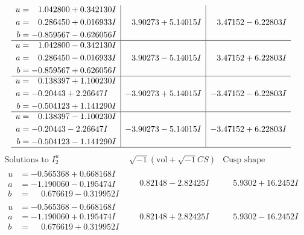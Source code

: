 \documentclass[1p]{elsarticle_modified}
\theoremstyle{definition}
\newcommand{\I}{\sqrt{-1}}
\begin{document}
$$\begin{array}{c|c|c}
\begin{aligned}
u &= \phantom{-}1.042800 + 0.342130 I \\
a &= \phantom{-}0.286450 + 0.016933 I \\
b &= -0.859567 - 0.626056 I\end{aligned}
 & \phantom{-}3.90273 + 5.14015 I & \phantom{-}3.47152 - 6.22803 I \\ \hline\begin{aligned}
u &= \phantom{-}1.042800 - 0.342130 I \\
a &= \phantom{-}0.286450 - 0.016933 I \\
b &= -0.859567 + 0.626056 I\end{aligned}
 & \phantom{-}3.90273 - 5.14015 I & \phantom{-}3.47152 + 6.22803 I \\ \hline\begin{aligned}
u &= \phantom{-}0.138397 + 1.100230 I \\
a &= -0.20443 + 2.26647 I \\
b &= -0.504123 + 1.141290 I\end{aligned}
 & -3.90273 + 5.14015 I & -3.47152 - 6.22803 I \\ \hline\begin{aligned}
u &= \phantom{-}0.138397 - 1.100230 I \\
a &= -0.20443 - 2.26647 I \\
b &= -0.504123 - 1.141290 I\end{aligned}
 & -3.90273 - 5.14015 I & -3.47152 + 6.22803 I\\
 \hline 
 \end{array}$$\newpage$$\begin{array}{c|c|c}  
\text{Solutions to }I^u_{2}& \I (\text{vol} + \sqrt{-1}CS) & \text{Cusp shape}\\
 \hline 
\begin{aligned}
u &= -0.565368 + 0.668168 I \\
a &= -1.190060 - 0.195474 I \\
b &= \phantom{-}0.676619 - 0.319952 I\end{aligned}
 & \phantom{-}0.82148 - 2.82425 I & \phantom{-}5.9302 + 16.2452 I \\ \hline\begin{aligned}
u &= -0.565368 - 0.668168 I \\
a &= -1.190060 + 0.195474 I \\
b &= \phantom{-}0.676619 + 0.319952 I\end{aligned}
 & \phantom{-}0.82148 + 2.82425 I & \phantom{-}5.9302 - 16.2452 I \\ \hline\begin{aligned}

\end{aligned}
\end{array}$$
\end{document}
